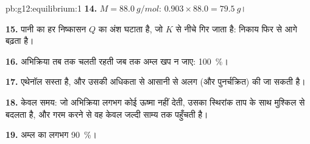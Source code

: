 \begin{solution}{pb:g12:equilibrium:1}
\textbf{14.} $M = \qty{88.0}{g/mol}$: $0.903 \times 88.0 = \qty{79.5}{g}$।

\textbf{15.} पानी का हर निष्कासन $Q$ का अंश घटाता है, जो
$K$ से नीचे गिर जाता है: निकाय फिर से आगे बढ़ता है।

\textbf{16.} अभिक्रिया तब तक चलती रहती जब तक अम्ल खप न जाए:
\qty{100}{\percent}।

\textbf{17.} एथेनॉल सस्ता है, और उसकी अधिकता  से आसानी से अलग
(और पुनर्चक्रित) की जा सकती है।

\textbf{18.} केवल समय: जो अभिक्रिया लगभग कोई ऊष्मा नहीं देती, उसका
स्थिरांक ताप के साथ मुश्किल से बदलता है, और गरम करने से वह केवल
जल्दी साम्य तक पहुँचती है।

\textbf{19.} अम्ल का लगभग \qty{90}{\percent}।
\end{solution}
